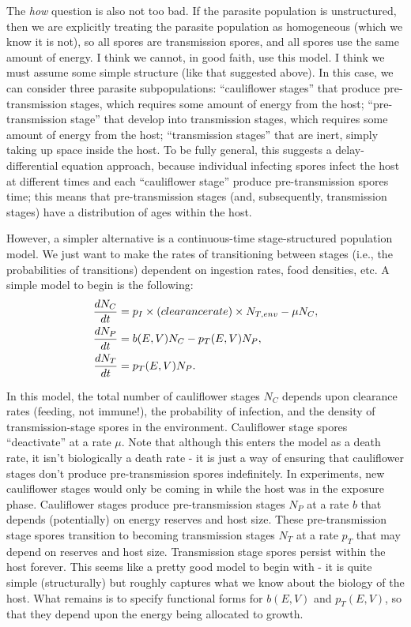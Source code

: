 \documentclass[11pt,reqno,final,pdftex]{amsart}\usepackage[]{graphicx}\usepackage[]{color}
\theoremstyle{plain}
\numberwithin{equation}{part}
\begin{document}
The \emph{how} question is also not too bad.
If the parasite population is unstructured, then we are explicitly treating the parasite population as homogeneous (which we know it is not), so all spores are transmission spores, and all spores use the same amount of energy.
I think we cannot, in good faith, use this model.
I think we must assume some simple structure (like that suggested above).
In this case, we can consider three parasite subpopulations: ``cauliflower stages'' that produce pre-transmission stages, which requires some amount of energy from the host; ``pre-transmission stage'' that develop into transmission stages, which requires some amount of energy from the host; ``transmission stages'' that are inert, simply taking up space inside the host.
To be fully general, this suggests a delay-differential equation approach, because individual infecting spores infect the host at different times and each ``cauliflower stage'' produce pre-transmission spores time; this means that pre-transmission stages (and, subsequently, transmission stages) have a distribution of ages within the host.

However, a simpler alternative is a continuous-time stage-structured population model.
We just want to make the rates of transitioning between stages (i.e., the probabilities of transitions) dependent on ingestion rates, food densities, etc.
A simple model to begin is the following:
\begin{align}
\frac{dN_C}{dt} &= p_I \times \text(clearance rate) \times N_{T,env} - \mu N_C, \\
\frac{dN_P}{dt} &= b(E,V) N_C - p_T(E,V) N_P, \\
\frac{dN_T}{dt} &= p_T(E,V) N_P.
\end{align}

In this model, the total number of cauliflower stages $N_C$ depends upon clearance rates (feeding, not immune!), the probability of infection, and the density of transmission-stage spores in the environment.
Cauliflower stage spores ``deactivate'' at a rate $\mu$.
Note that although this enters the model as a death rate, it isn't biologically a death rate - it is just a way of ensuring that cauliflower stages don't produce pre-transmission spores indefinitely.
In experiments, new cauliflower stages would only be coming in while the host was in the exposure phase.
Cauliflower stages produce pre-transmission stages $N_P$ at a rate $b$ that depends (potentially) on energy reserves and host size.
These pre-transmission stage spores transition to becoming transmission stages $N_T$ at a rate $p_T$ that may depend on reserves and host size.
Transmission stage spores persist within the host forever.
This seems like a pretty good model to begin with - it is quite simple (structurally) but roughly captures what we know about the biology of the host.
What remains is to specify functional forms for $b(E,V)$ and $p_T(E,V)$, so that they depend upon the energy being allocated to growth.
\end{document}
